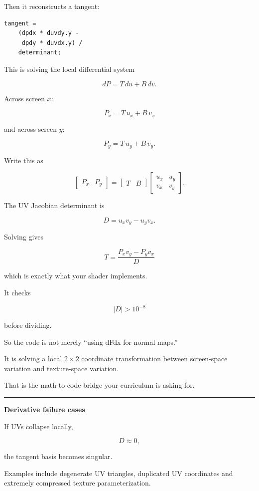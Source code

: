 Then it reconstructs a tangent:

\begin{verbatim}
tangent =
    (dpdx * duvdy.y -
     dpdy * duvdx.y) /
    determinant;
\end{verbatim}

This is solving the local differential system

\[
dP
=
T\,du+B\,dv.
\]

Across screen \(x\):

\[
P_x
=
T\,u_x+B\,v_x
\]

and across screen \(y\):

\[
P_y
=
T\,u_y+B\,v_y.
\]

Write this as

\[
\begin{bmatrix}
P_x & P_y
\end{bmatrix}
=
\begin{bmatrix}
T & B
\end{bmatrix}
\begin{bmatrix}
u_x & u_y\\
v_x & v_y
\end{bmatrix}.
\]

The UV Jacobian determinant is

\[
D=u_xv_y-u_yv_x.
\]

Solving gives

\[
\boxed{
T=
\frac{
P_xv_y-P_yv_x
}{D}
}
\]

which is exactly what your shader implements.

It checks

\[
|D|>10^{-8}
\]

before dividing.

So the code is not merely ``using dFdx for normal maps.''

It is solving a local \(2\times2\) coordinate transformation between screen-space variation and texture-space variation.

That is the math-to-code bridge your curriculum is asking for.

\begin{center}\rule{0.5\linewidth}{0.5pt}\end{center}

\textbf{Derivative failure cases}

If UVs collapse locally,

\[
D\approx0,
\]

the tangent basis becomes singular.

Examples include degenerate UV triangles, duplicated UV coordinates and extremely compressed texture parameterization.

